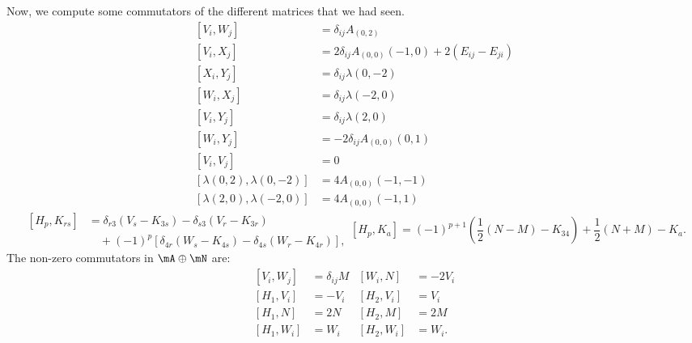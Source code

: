 Now, we compute some commutators of the different matrices that we had seen.
\begin{subequations}
	\begin{align}
		[V_i,W_j]                    & =\delta_{ij}A_{(0,2)}                         \\
		[V_i,X_j]                    & =2\delta_{ij}A_{(0,0)}(-1,0)+2(E_{ij}-E_{ji}) \\
		[X_i,Y_j]                    & =\delta_{ij}\lambda(0,-2)                     \\
		[W_i,X_j]                    & =\delta_{ij}\lambda(-2,0)                     \\
		[V_i,Y_j]                    & =\delta_{ij}\lambda(2,0)                      \\
		[W_i,Y_j]                    & =-2\delta_{ij}A_{(0,0)}(0,1)                  \\
		[V_i,V_j]                    & =0                                            \\
		[\lambda(0,2),\lambda(0,-2)] & =4A_{(0,0)}(-1,-1)                            \\
		[\lambda(2,0),\lambda(-2,0)] & =4A_{(0,0)}(-1,1)
	\end{align}
\end{subequations}
\begin{subequations}
	\begin{equation}
		\begin{split}
			[H_p,K_{rs}]&=\delta_{r3}(V_s-K_{3s})-\delta_{s3}(V_r-K_{3r})\\
			&\quad+(-1)^p[\delta_{4r}(W_s-K_{4s})-\delta_{4s}(W_r-K_{4r})],
		\end{split}
	\end{equation}
	\begin{equation}
		[H_p,K_a]=(-1)^{p+1}(\frac{1}{2}(N-M)-K_{34})+\frac{1}{2}(N+M)-K_a.
	\end{equation}
\end{subequations}
The non-zero commutators in $\mA\oplus\mN$ are:
\begin{subequations}		\label{TabelPrem}
	\begin{align}
		[V_i,W_j] & =\delta_{ij}M & [W_i,N]   & =-2V_i \\
		[H_1,V_i] & =-V_i         & [H_2,V_i] & =V_i   \\
		[H_1,N]   & =2N           & [H_2,M]   & =2M    \\
		[H_1,W_i] & =W_i          & [H_2,W_i] & =W_i.
	\end{align}
\end{subequations}

